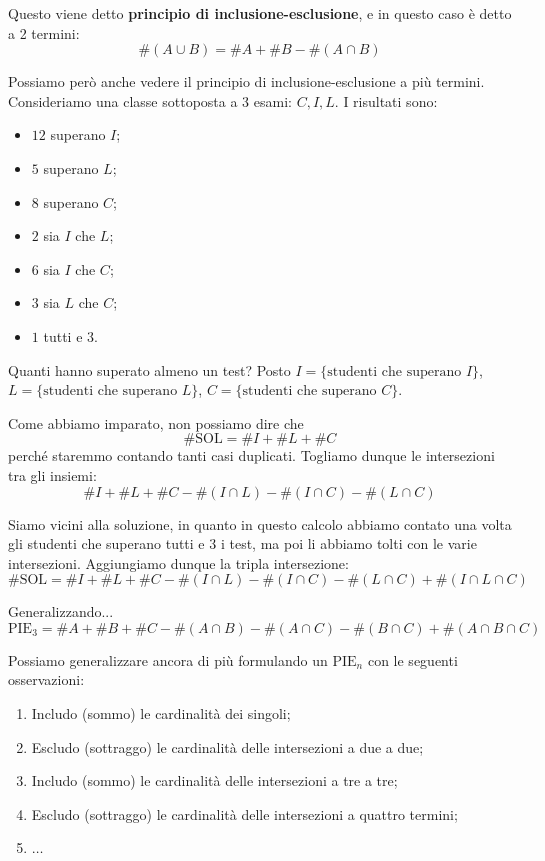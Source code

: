 \documentclass[12pt]{report}
\begin{document}
	Questo viene detto \textbf{principio di inclusione-esclusione}, e in questo caso è detto a 2 termini:
	\[
		\#(A \cup B) = \#A + \#B - \#(A \cap B)
	\]
	
	Possiamo però anche vedere il principio di inclusione-esclusione a più termini.
	Consideriamo una classe sottoposta a 3 esami: $C, I, L$. I risultati sono:
	\begin{itemize}
		
		\item $12$ superano $I$;
		
		\item $5$ superano $L$;
		
		\item $8$ superano $C$;
		
		\item $2$ sia $I$ che $L$;
		
		\item $6$ sia $I$ che $C$;
		
		\item $3$ sia $L$ che $C$;
		
		\item $1$ tutti e $3$.
		
	\end{itemize}
	
	Quanti hanno superato almeno un test?
	Posto $I = \{\text{studenti che superano } I\}$, $L = \{\text{studenti che superano } L\}$, $C = \{\text{studenti che superano } C\}$.
	
	Come abbiamo imparato, non possiamo dire che 
	\[
		\#\text{SOL} = \#I + \#L + \#C
	\]
	perché staremmo contando tanti casi duplicati. Togliamo dunque le intersezioni tra gli insiemi:
	\[
		\#I + \#L + \#C - \#(I \cap L) - \#(I \cap C) - \#(L \cap C)
	\]
	
	Siamo vicini alla soluzione, in quanto in questo calcolo abbiamo contato una volta gli studenti che superano tutti e $3$ i test, ma poi li abbiamo tolti con le varie intersezioni. Aggiungiamo dunque la tripla intersezione:
	\[
		\#\text{SOL} = \#I + \#L + \#C - \#(I \cap L) - \#(I \cap C) - \#(L \cap C) + \#(I \cap L \cap C)
	\]
	
	Generalizzando...
	\[
		\text{PIE}_3 = \#A + \#B + \#C - \#(A \cap B) - \#(A \cap C) - \#(B \cap C) + \#(A \cap B \cap C)
	\]
	
	Possiamo generalizzare ancora di più formulando un $\text{PIE}_n$ con le seguenti osservazioni:
	\begin{enumerate}
		
		\item Includo (sommo) le cardinalità dei singoli;
		
		\item Escludo (sottraggo) le cardinalità delle intersezioni a due a due;
		
		\item Includo (sommo) le cardinalità delle intersezioni a tre a tre;
		
		\item Escludo (sottraggo) le cardinalità delle intersezioni a quattro termini;
		
		\item $\dots$
		
	\end{enumerate}
	
\end{document}
